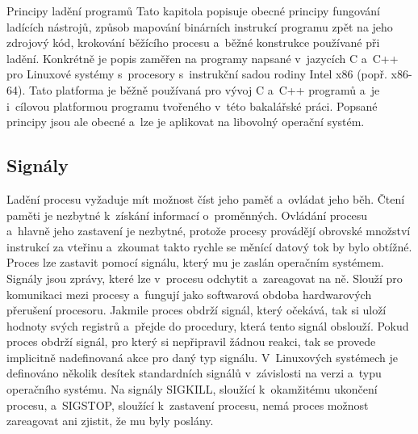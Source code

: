 \documentclass[czech,bachelor,male,python,dept460,hidelinks]{diploma}						%
\begin{document}
\begin{section}{Principy ladění programů}
\label{sec:DebuggingPrinciples}
	Tato kapitola popisuje obecné principy fungování ladících nástrojů, způsob mapování binárních instrukcí programu zpět na jeho zdrojový kód,
	krokování běžícího procesu a~běžné konstrukce používané při ladění. Konkrétně je popis zaměřen na programy napsané v~jazycích C a~C++
	pro Linuxové systémy s~procesory s~instrukční sadou rodiny Intel x86 (popř. x86-64).
	Tato platforma je běžně používaná pro vývoj C a~C++ programů a~je i~cílovou platformou programu tvořeného v~této bakalářské práci.
	Popsané principy jsou ale obecné a~lze je aplikovat na libovolný operační systém.
		
	\subsection{Signály}
		Ladění procesu vyžaduje mít možnost číst jeho paměť a~ovládat jeho běh. Čtení paměti je nezbytné k~získání informací o~proměnných.
		Ovládání procesu a~hlavně jeho zastavení je nezbytné, protože procesy provádějí obrovské množství instrukcí za vteřinu
		a~zkoumat takto rychle se měnící datový tok by bylo obtížné. Proces lze zastavit pomocí signálu, který mu je zaslán operačním systémem.
		Signály jsou zprávy, které lze v~procesu odchytit a~zareagovat na ně. \cite[21]{tanenbaum}
		Slouží pro komunikaci mezi procesy a~fungují jako softwarová obdoba hardwarových přerušení procesoru.
		Jakmile proces obdrží signál, který očekává, tak si uloží hodnoty svých registrů a~přejde do procedury, která tento signál obslouží.
		Pokud proces obdrží signál, pro který si nepřipravil žádnou reakci, tak se provede implicitně nadefinovaná akce pro daný typ signálu.
		V~Linuxových systémech je definováno několik desítek standardních signálů v~závislosti na verzi a~typu operačního systému.
		Na signály SIGKILL, sloužící k~okamžitému ukončení procesu, a~SIGSTOP, sloužící k~zastavení procesu, nemá proces možnost zareagovat ani
		zjistit, že mu byly poslány.
	

\end{section}
\end{document}
